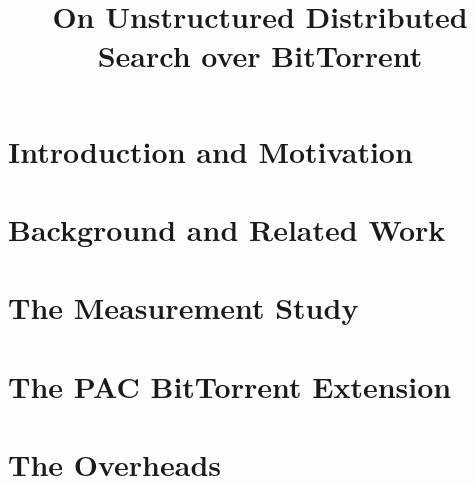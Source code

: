 \documentclass[10pt,peerreviewca]{IEEEtran}
\begin{document}
\title{On Unstructured Distributed Search over BitTorrent}


\maketitle

\begin{abstract}
    
    

\end{abstract}

\IEEEpeerreviewmaketitle

\section{Introduction and Motivation}\label{sec:introduction}

    

\section{Background and Related Work}\label{sec:background}

    

\section{The Measurement Study}\label{sec:measurement}

    

\section{The PAC BitTorrent Extension}\label{sec:extension}

    

\section{The Overheads}\label{sec:overheads}
\end{document}
